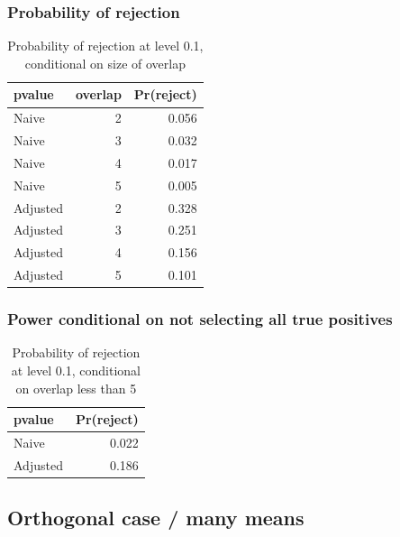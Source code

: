 \documentclass{beamer}
\begin{document}
\begin{frame}
  \frametitle{Probability of rejection}


\begin{table}

\caption{\label{tab:1}Probability of rejection at level 0.1, conditional on size of overlap}
\centering
\begin{tabular}[t]{l|r|r}
\hline
pvalue & overlap & Pr(reject)\\
\hline
Naive & 2 & 0.056\\
\hline
Naive & 3 & 0.032\\
\hline
Naive & 4 & 0.017\\
\hline
Naive & 5 & 0.005\\
\hline
Adjusted & 2 & 0.328\\
\hline
Adjusted & 3 & 0.251\\
\hline
Adjusted & 4 & 0.156\\
\hline
Adjusted & 5 & 0.101\\
\hline
\end{tabular}
\end{table}

  
\end{frame}



\begin{frame}
  \frametitle{Power conditional on not selecting all true positives}


\begin{table}

\caption{\label{tab:}Probability of rejection at level 0.1, conditional on overlap less than 5}
\centering
\begin{tabular}[t]{l|r}
\hline
pvalue & Pr(reject)\\
\hline
Naive & 0.022\\
\hline
Adjusted & 0.186\\
\hline
\end{tabular}
\end{table}

  
\end{frame}


\subsection{Orthogonal case / many means}
\end{document}
